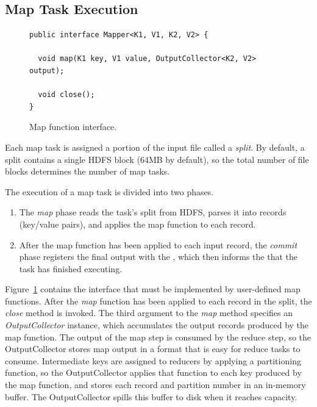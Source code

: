 \subsection{Map Task Execution}
\label{ch:mrback:sec:maptask}

\begin{figure}[t]
\ssp
\begin{minipage}{\linewidth}
\centering
\begin{verbatim}
public interface Mapper<K1, V1, K2, V2> {
  
  void map(K1 key, V1 value, OutputCollector<K2, V2> output);

  void close();
}
\end{verbatim}
\end{minipage}
\caption{Map function interface.}
\label{fig:mapfunction}
\end{figure}

Each map task is assigned a portion of the input file called a \emph{split}. By
default, a split contains a single HDFS block (64MB by default), so the total
number of file blocks determines the number of map tasks.

The execution of a map task is divided into two phases.
\begin{enumerate}
\item
  The \emph{map} phase reads the task's split from HDFS, parses it into
  records (key/value pairs), and applies the map function to each
  record.
\item
  After the map function has been applied to each input record, the
  \emph{commit} phase registers the final output with the {\TT}, which
  then informs the {\JT} that the task has finished executing.
\end{enumerate}

Figure~\ref{fig:mapfunction} contains the interface that must be
implemented by user-defined map functions. After the \emph{map}
function has been applied to each record in the split, the
\emph{close} method is invoked. The third argument to the \emph{map} method 
specifies an \emph{OutputCollector} instance, which accumulates the output records 
produced by the map function. The output of the map step is consumed by the reduce step, 
so the OutputCollector stores map output in a format that is easy for reduce tasks to
consume. Intermediate keys are assigned to reducers by applying a partitioning
function, so the OutputCollector applies that function to each key produced by
the map function, and stores each record and partition number in an in-memory
buffer. The OutputCollector spills this buffer to disk when it reaches capacity.

